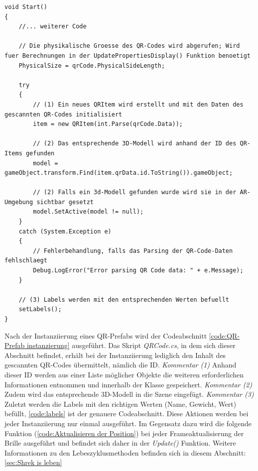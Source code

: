 \begin{lstlisting}[style=csharp, caption={Instanzierung eines QR-Prefabs}, label=code:QR-Prefab instanzierung]
void Start()
{
    //... weiterer Code

    // Die physikalische Groesse des QR-Codes wird abgerufen; Wird fuer Berechnungen in der UpdatePropertiesDisplay() Funktion benoetigt
    PhysicalSize = qrCode.PhysicalSideLength;

    try
    {
        // (1) Ein neues QRItem wird erstellt und mit den Daten des gescannten QR-Codes initialisiert
        item = new QRItem(int.Parse(qrCode.Data));

        // (2) Das entsprechende 3D-Modell wird anhand der ID des QR-Items gefunden
        model = gameObject.transform.Find(item.qrData.id.ToString()).gameObject;

        // (2) Falls ein 3d-Modell gefunden wurde wird sie in der AR-Umgebung sichtbar gesetzt
        model.SetActive(model != null);
    }
    catch (System.Exception e)
    {
        // Fehlerbehandlung, falls das Parsing der QR-Code-Daten fehlschlaegt
        Debug.LogError("Error parsing QR Code data: " + e.Message);
    }

    // (3) Labels werden mit den entsprechenden Werten befuellt
    setLabels();
}
\end{lstlisting}

Nach der Instanziierung eines QR-Prefabs wird der Codeabschnitt \ref{code:QR-Prefab instanzierung} ausgeführt. Das Skript \textit{QRCode.cs}, in dem sich dieser Abschnitt befindet, erhält bei der Instanziierung lediglich den Inhalt des gescannten QR-Codes übermittelt, nämlich die ID. \textit{Kommentar (1)} Anhand dieser ID werden aus einer Liste möglicher Objekte die weiteren erforderlichen Informationen entnommen und innerhalb der Klasse gespeichert. \textit{Kommentar (2)} Zudem wird das entsprechende 3D-Modell in die Szene eingefügt. \textit{Kommentar (3)} Zuletzt werden die Labels mit den richtigen Werten (Name, Gewicht, Wert) befüllt, \ref{code:labels} ist der genauere Codeabschnitt. Diese Aktionen werden bei jeder Instanziierung nur einmal ausgeführt. Im Gegensatz dazu wird die folgende Funktion (\ref{code:Aktualisieren der Position}) bei jeder Frameaktualisierung der Brille ausgeführt und befindet sich daher in der \textit{Update()} Funktion. Weitere Informationen zu den Lebeszyklusmethoden befinden sich in diesem Abschnitt: \ref{sec:Shrek is leben}

